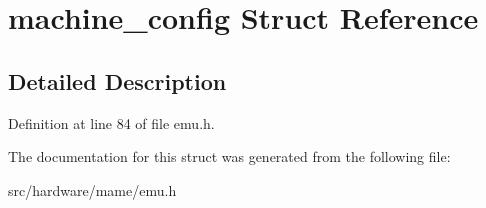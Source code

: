\hypertarget{structmachine__config}{\section{machine\-\_\-config Struct Reference}
\label{structmachine__config}
}


\subsection{Detailed Description}


Definition at line 84 of file emu.\-h.



The documentation for this struct was generated from the following file\-:\begin{DoxyCompactItemize}
\item 
src/hardware/mame/emu.\-h\end{DoxyCompactItemize}
